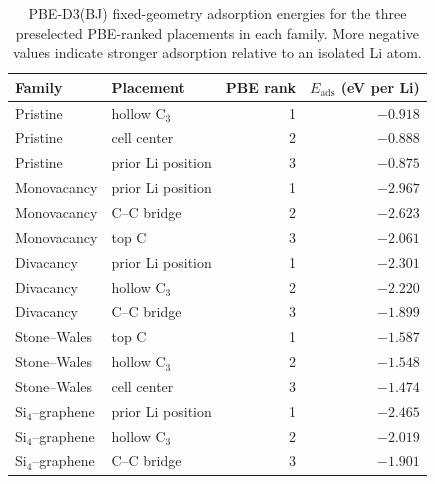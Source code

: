 \begin{table}[!htbp]
  \centering
  \small
  \caption{PBE-D3(BJ) fixed-geometry adsorption energies for the three
  preselected PBE-ranked placements in each family. More negative values
  indicate stronger adsorption relative to an isolated Li atom.}
  \label{tab:si_d3_sites}
  \begin{tabular}{llrr}
    \toprule
    Family & Placement & PBE rank & $E_{\mathrm{ads}}$ (eV per Li) \\
    \midrule
    Pristine & hollow C$_3$ & 1 & $-0.918$ \\
    Pristine & cell center & 2 & $-0.888$ \\
    Pristine & prior Li position & 3 & $-0.875$ \\
    Monovacancy & prior Li position & 1 & $-2.967$ \\
    Monovacancy & C--C bridge & 2 & $-2.623$ \\
    Monovacancy & top C & 3 & $-2.061$ \\
    Divacancy & prior Li position & 1 & $-2.301$ \\
    Divacancy & hollow C$_3$ & 2 & $-2.220$ \\
    Divacancy & C--C bridge & 3 & $-1.899$ \\
    Stone--Wales & top C & 1 & $-1.587$ \\
    Stone--Wales & hollow C$_3$ & 2 & $-1.548$ \\
    Stone--Wales & cell center & 3 & $-1.474$ \\
    Si$_4$--graphene & prior Li position & 1 & $-2.465$ \\
    Si$_4$--graphene & hollow C$_3$ & 2 & $-2.019$ \\
    Si$_4$--graphene & C--C bridge & 3 & $-1.901$ \\
    \bottomrule
  \end{tabular}
\end{table}
